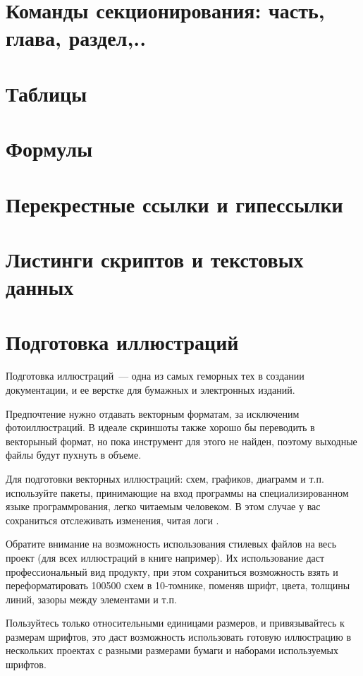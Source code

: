 \section{Команды секционирования: часть, глава, раздел,..}
\section{Таблицы}
\section{Формулы}
\section{Перекрестные ссылки и гипессылки}
\section{Листинги скриптов и текстовых данных}
\section{Подготовка иллюстраций}

Подготовка иллюстраций\ --- одна из самых геморных тех в создании документации,
и ее верстке для бумажных и электронных изданий.

Предпочтение нужно отдавать векторным форматам, за исключеним фотоиллюстраций.
В идеале скриншоты также хорошо бы переводить в векторыный формат, но пока
инструмент для этого не найден, поэтому выходные файлы будут пухнуть в объеме.

Для подготовки векторных иллюстраций: схем, графиков, диаграмм и т.п.
используйте пакеты, принимающие на вход программы на специализированном языке
программрования, легко читаемым человеком. В этом случае у вас сохраниться
отслеживать изменения, читая логи \vcs.

Обратите внимание на возможность использования стилевых файлов на весь проект
(для всех иллюстраций в книге например). Их использование даст профессиональный
вид продукту, при этом сохраниться возможность взять и переформатировать 100500
схем в 10-томнике, поменяв шрифт, цвета, толщины линий, зазоры между элементами
и т.п. 

Пользуйтесь только относительными единицами размеров, и привязывайтесь к
размерам шрифтов, это даст возможность использовать готовую иллюстрацию в
нескольких проектах с разными размерами бумаги и наборами используемых шрифтов.

